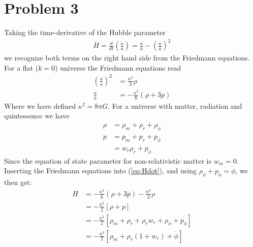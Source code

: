 \documentclass[reprint,english,notitlepage,nofootinbib]{revtex4-1}  %
\numberwithin{equation}{section}
\begin{document}
\section{Problem 3}
Taking the time-derivative of the Hubble parameter
\begin{align}
	\dot{H} = \frac{d}{dt}\left(\frac{\dot{a}}{a}\right) = \frac{\ddot{a}}{a} - \left(\frac{\dot{a}}{a}\right)^2 \label{eq:Hdot}
\end{align}
we recognize both terms on the right hand side from the Friedmann equations. For a flat ($k=0$) universe the Friedmann equations read
\begin{align}
	\left(\frac{\dot{a}}{a}\right)^2 &= \frac{\kappa^2}{3}\rho \\
	\frac{\ddot{a}}{a}		&= -\frac{\kappa^2}{6}\left(\rho + 3p \right)
\end{align}
Where we have defined $\kappa^2 = 8\pi G$. For a universe with matter, radiation
and quintessence we have
\begin{align}
	\rho &= \rho_m + \rho_r + \rho_\phi \\
	p    &= p_m + p_r + p_\phi \\
         &= w_{r}\rho_r + p_{\phi}
\end{align}
Since the equation of state parameter for non-relativistic matter is $w_{m} = 0$.
Inserting the Friedmann equations into (\ref{eq:Hdot}), and using $\rho_{\phi} + p_{\phi} = \dot{\phi}$, we then
get:
\begin{align}
	\dot{H} &= -\frac{\kappa^2}{6}\left(\rho + 3p \right) - \frac{\kappa^2}{3}\rho \\
					&= -\frac{\kappa^2}{2} \left[\rho + p \right] \\
					&= -\frac{\kappa^2}{2} \left[ \rho_m + \rho_r + \rho_r w_r + \rho_{\phi} + p_{\phi}\right]\\
					&= -\frac{\kappa^2}{2} \left[ \rho_m + \rho_r(1+w_r) + \dot{\phi}\right]
\end{align}
\end{document}
